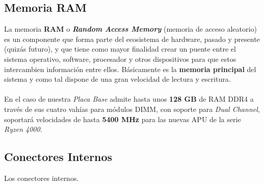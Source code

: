 \documentclass{article}
\begin{document}
\subsection{Memoria RAM}
La memoria \textbf{RAM} o \textit{\textbf{Random Access Memory}} (memoria de acceso aleatorio) es un componente que forma parte del ecosistema de hardware, pasado y presente (quizás futuro), y que tiene como mayor finalidad 
crear un puente entre el sistema operativo, software, 
procesador y otros dispositivos para que estos intercambien información entre ellos. Básicamente es la \textbf{memoria principal} del sistema y como tal dispone de una gran velocidad de lectura y escritura.\\
\\
En el caso de nuestra \textit{Placa Base} admite hasta unos \textbf{128 GB} de RAM DDR4 a través de sus cuatro vahías para módulos DIMM, con soporte para \textit{Dual Channel}, soportará velocidades de hasta \textbf{5400 MHz} 
para las nuevas APU de la serie \textit{Ryzen 4000}.
\\
\subsection{Conectores Internos}
Los conectores internos.
\end{document}

